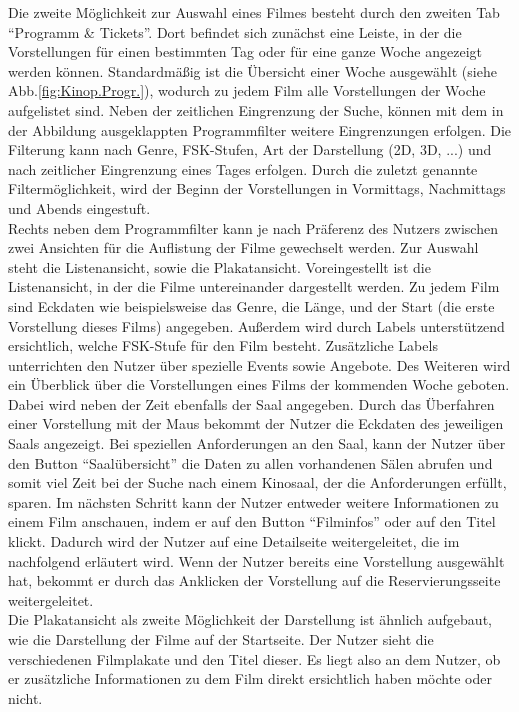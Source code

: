 	Die zweite Möglichkeit zur Auswahl eines Filmes besteht durch den zweiten Tab \enquote{Programm \& Tickets}. Dort befindet sich zunächst eine Leiste, in der die Vorstellungen für einen bestimmten Tag oder für eine ganze Woche angezeigt werden können. Standardmäßig ist die Übersicht einer Woche ausgewählt (siehe Abb.\vref{fig:Kinop.Progr.}), wodurch zu jedem Film alle Vorstellungen der Woche aufgelistet sind. Neben der zeitlichen Eingrenzung der Suche, können mit dem in der Abbildung ausgeklappten Programmfilter weitere Eingrenzungen erfolgen. Die Filterung kann nach Genre, FSK-Stufen, Art der Darstellung (2D, 3D, ...) und nach zeitlicher Eingrenzung eines Tages erfolgen. Durch die zuletzt genannte Filtermöglichkeit, wird der Beginn der Vorstellungen in Vormittags, Nachmittags und Abends eingestuft.
	\\Rechts neben dem Programmfilter kann je nach Präferenz des Nutzers zwischen zwei Ansichten für die Auflistung der Filme gewechselt werden. Zur Auswahl steht die Listenansicht, sowie die Plakatansicht. Voreingestellt ist die Listenansicht, in der die Filme untereinander dargestellt werden. Zu jedem Film sind Eckdaten wie beispielsweise das Genre, die Länge, und der Start (die erste Vorstellung dieses Films) angegeben. Außerdem wird durch Labels unterstützend ersichtlich, welche FSK-Stufe für den Film besteht. Zusätzliche Labels unterrichten den Nutzer über spezielle Events sowie Angebote. Des Weiteren wird ein Überblick über die Vorstellungen eines Films der kommenden Woche geboten. Dabei wird neben der Zeit ebenfalls der Saal angegeben. Durch das Überfahren einer Vorstellung mit der Maus bekommt der Nutzer die Eckdaten des jeweiligen Saals angezeigt. Bei speziellen Anforderungen an den Saal, kann der Nutzer über den Button \enquote{Saalübersicht} die Daten zu allen vorhandenen Sälen abrufen und somit viel Zeit bei der Suche nach einem Kinosaal, der die Anforderungen erfüllt, sparen. Im nächsten Schritt kann der Nutzer entweder weitere Informationen zu einem Film anschauen, indem er auf den Button \enquote{Filminfos} oder auf den Titel klickt. Dadurch wird der Nutzer auf eine Detailseite weitergeleitet, die im nachfolgend erläutert wird. Wenn der Nutzer bereits eine Vorstellung ausgewählt hat, bekommt er durch das Anklicken der Vorstellung auf die Reservierungsseite weitergeleitet. 
	\\Die Plakatansicht als zweite Möglichkeit der Darstellung ist ähnlich aufgebaut, wie die Darstellung der Filme auf der Startseite. Der Nutzer sieht die verschiedenen Filmplakate und den Titel dieser. Es liegt also an dem Nutzer, ob er zusätzliche Informationen zu dem Film direkt ersichtlich haben möchte oder nicht.  
